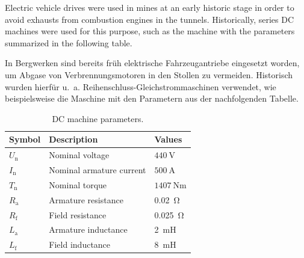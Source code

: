 

Electric vehicle drives were used in mines at an early historic stage in order to avoid exhausts  from combustion engines in the tunnels. Historically, series DC machines were used for this purpose, such as the machine with the parameters summarized in the following table.

\begin{germanblock}
    In Bergwerken sind bereits früh elektrische Fahrzeugantriebe eingesetzt worden, um Abgase von Verbrennungsmotoren in den Stollen zu vermeiden. Historisch wurden hierfür u.~a. Reihenschluss-Gleichstrommaschinen verwendet, wie beispielsweise die Maschine mit den Parametern aus der nachfolgenden Tabelle.
\end{germanblock}
\begin{table}[htb]
    \caption{DC machine parameters.}
    \centering
    \begin{tabular}{lll}\toprule
    Symbol  & Description       & Values \\
    \midrule
    $U_{\mathrm{n}}$    & Nominal voltage           & $\SI{440}{\volt}$ \\
    $I_{\mathrm{n}}$    & Nominal armature current           & $\SI{500}{\ampere}$ \\
    $T_{\mathrm{n}}$    & Nominal torque             & $\SI{1407}{\newton\meter}$ \\
    $R_\mathrm{a}$ & Armature resistance & \SI{0.02}{\ohm}\\
    $R_\mathrm{f}$ & Field resistance & \SI{0.025}{\ohm}\\
    $L_\mathrm{a}$ & Armature inductance & \SI{2}{\milli\henry}\\
    $L_\mathrm{f}$ & Field inductance & \SI{8}{\milli\henry}\\
    \bottomrule
    \end{tabular}
    \label{tab:characteristicsIM_task3}
\end{table}




